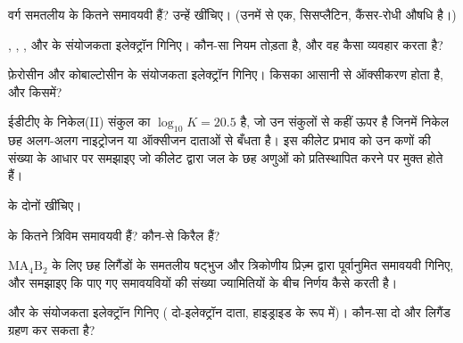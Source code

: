 \begin{exercise}[$\star\star$]\label{exo:b2:coordination-complexes:5}
वर्ग समतलीय \ce{[PtCl2(NH3)2]} के कितने समावयवी हैं? उन्हें खींचिए। (उनमें से एक,
सिसप्लैटिन, कैंसर-रोधी औषधि है।)
\end{exercise}

\begin{exercise}[$\star\star$]\label{exo:b2:coordination-complexes:6}
, , ,
 और  के संयोजकता इलेक्ट्रॉन गिनिए। कौन-सा नियम तोड़ता है, और वह कैसा व्यवहार करता है?
\end{exercise}

\begin{exercise}[$\star\star$]\label{exo:b2:coordination-complexes:7}
फ़ेरोसीन और कोबाल्टोसीन  के संयोजकता इलेक्ट्रॉन गिनिए। किसका
आसानी से ऑक्सीकरण होता है, और किसमें?
\end{exercise}

\begin{exercise}[$\star\star$]\label{exo:b2:coordination-complexes:8}
ईडीटीए के निकेल(II) संकुल का $\log_{10}K = 20.5$ है, जो उन संकुलों से कहीं ऊपर है जिनमें
निकेल छह अलग-अलग नाइट्रोजन या ऑक्सीजन दाताओं से बँधता है। इस कीलेट प्रभाव को
उन कणों की संख्या के आधार पर समझाइए जो कीलेट द्वारा जल के छह
अणुओं को प्रतिस्थापित करने पर मुक्त होते हैं।
\end{exercise}

\begin{exercise}[$\star\star$]\label{exo:b2:coordination-complexes:9}
 के दोनों  खींचिए।
\end{exercise}

\begin{exercise}[$\star\star\star$]\label{exo:b2:coordination-complexes:10}
\ce{[CoCl2(en)2]+} के कितने त्रिविम समावयवी हैं? कौन-से किरैल हैं?
\end{exercise}

\begin{exercise}[$\star\star\star$]\label{exo:b2:coordination-complexes:11}
$\mathrm{MA_4B_2}$ के लिए छह लिगैंडों के समतलीय षट्भुज और त्रिकोणीय
प्रिज़्म द्वारा पूर्वानुमित समावयवी गिनिए, और समझाइए कि पाए गए समावयवियों की संख्या
ज्यामितियों के बीच निर्णय कैसे करती है।
\end{exercise}

\begin{exercise}[$\star\star\star$]\label{exo:b2:coordination-complexes:12}
 और  के संयोजकता इलेक्ट्रॉन गिनिए
( दो-इलेक्ट्रॉन दाता,  हाइड्राइड के रूप में)। कौन-सा दो और
लिगैंड ग्रहण कर सकता है?
\end{exercise}

